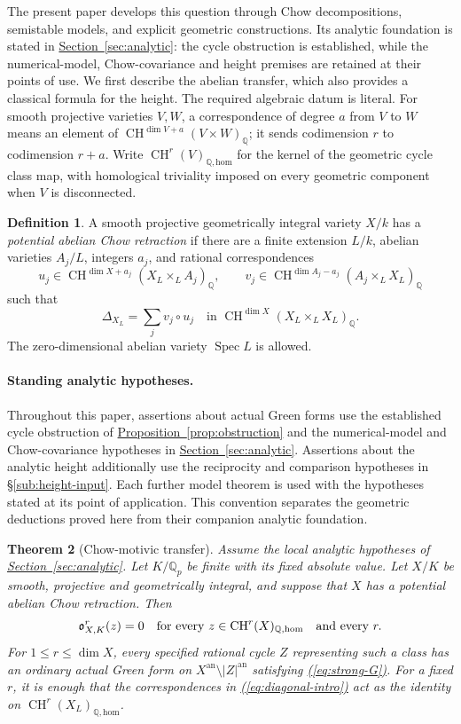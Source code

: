 \documentclass[11pt,a4paper]{article}
\newtheorem{theorem}{Theorem}[section]
\theoremstyle{definition}
\newtheorem{definition}[theorem]{Definition}
\theoremstyle{remark}\newtheorem{remark}[theorem]{Remark}
\numberwithin{equation}{section}
\newcommand{\Q}{\mathbb Q}\newcommand{\R}{\mathbb R}\newcommand{\C}{\mathbb C}
\newcommand{\CH}{\operatorname{CH}}\newcommand{\an}{\mathrm{an}}
\newcommand{\homol}{\mathrm{hom}}\newcommand{\BC}{\mathrm{BC}}
\newcommand{\Spec}{\operatorname{Spec}}\newcommand{\Bl}{\operatorname{Bl}}
\newcommand{\secref}[1]{\hyperref[#1]{\textcolor{sectionlink}{Section~\ref*{#1}}}}
\newcommand{\subref}[1]{\hyperref[#1]{\textcolor{sectionlink}{\S\ref*{#1}}}}
\newcommand{\propref}[1]{\hyperref[#1]{\textcolor{resultlink}{Proposition~\ref*{#1}}}}
\renewcommand{\eqref}[1]{\hyperref[#1]{\textcolor{equationlink}{(\ref*{#1})}}}
\begin{document}
The present paper develops this question through Chow decompositions,
semistable models, and explicit geometric constructions. Its analytic
foundation is stated in \secref{sec:analytic}: the cycle obstruction is
established, while the numerical-model, Chow-covariance and height
premises are retained at their points of use. We first describe the
abelian transfer, which also provides a classical formula for the height.
The required algebraic datum is literal.
For smooth projective varieties $V,W$, a correspondence of degree $a$ from
$V$ to $W$ means an element of
$\CH^{\dim V+a}(V\times W)_\Q$; it sends codimension $r$ to codimension
$r+a$. Write $\CH^r(V)_{\Q,\homol}$ for the kernel of the geometric
cycle class map, with homological triviality imposed on every geometric
component when $V$ is disconnected.

\begin{definition}\label{def:abelian-retraction}
A smooth projective geometrically integral variety $X/k$ has a
\emph{potential abelian Chow retraction} if there are a finite extension
$L/k$, abelian varieties $A_j/L$, integers $a_j$, and rational
correspondences
\[
 u_j\in\CH^{\dim X+a_j}(X_L\times_L A_j)_\Q,
 \qquad
 v_j\in\CH^{\dim A_j-a_j}(A_j\times_L X_L)_\Q
\]
such that
\begin{equation}\label{eq:diagonal-intro}
       \Delta_{X_L}=\sum_j v_j\circ u_j
       \quad\text{in }\CH^{\dim X}(X_L\times_L X_L)_\Q.
\end{equation}
The zero-dimensional abelian variety $\Spec L$ is allowed.
\end{definition}

\paragraph{Standing analytic hypotheses.}
Throughout this paper, assertions about actual Green forms use the
established cycle obstruction of \propref{prop:obstruction} and the
numerical-model and Chow-covariance hypotheses in
\secref{sec:analytic}. Assertions about the analytic height additionally
use the reciprocity and comparison hypotheses in \subref{sub:height-input}.
Each further model theorem is used with the hypotheses stated at its point
of application. This convention separates the geometric deductions proved
here from their companion analytic foundation.

\begin{theorem}[Chow-motivic transfer]\label{thm:main}
Assume the local analytic hypotheses of \secref{sec:analytic}.
Let $K/\Q_p$ be finite with its fixed absolute value. Let $X/K$ be smooth,
projective and geometrically integral, and suppose that $X$ has a potential
abelian Chow retraction. Then
\[
 \ob^r_{X,K}(z)=0
 \quad\text{for every }z\in\CH^r(X)_{\Q,\homol}
 \quad\text{and every }r.
\]
For $1\le r\le\dim X$, every specified rational cycle $Z$ representing
such a class has an ordinary actual Green form on
$X^{\an}\setminus |Z|^{\an}$ satisfying \eqref{eq:strong-G}.
For a fixed $r$, it is enough that the correspondences in
\eqref{eq:diagonal-intro} act as the identity on
$\CH^r(X_L)_{\Q,\homol}$.
\end{theorem}
\end{document}
